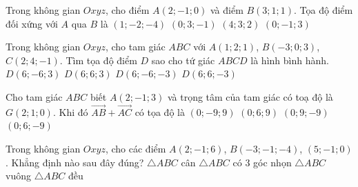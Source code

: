 \begin{ex}%
	Trong không gian $Oxyz$, cho điểm $A(2;-1;0)$ và điểm $B(3;1;1)$. Tọa độ điểm đối xứng với $A$ qua $B$ là
	\choice
	{$(1;-2;-4)$}
	{$(0; 3;-1)$}
	{\True $(4; 3; 2)$}
	{$(0;-1; 3)$}
\end{ex}

\begin{ex}%
	Trong không gian $Oxyz$, cho tam giác $ABC$ với $A(1;2;1)$, $B(-3;0;3)$, $C(2;4;-1)$. Tìm tọa độ điểm $D$ sao cho tứ giác $ABCD$ là hình bình hành.
	\choice
	{$D(6;-6;3)$}
	{$D(6;6;3)$}
	{$D(6;-6;-3)$}
	{\True $D(6;6;-3)$}
\end{ex}

\begin{ex}%
	Cho tam giác $ABC$ biết $A(2;-1;3)$ và trọng tâm của tam giác có toạ độ là $G(2;1;0)$. Khi đó $\overrightarrow{AB}+\overrightarrow{AC}$ có tọa độ là
	\choice
	{$(0;-9;9)$}
	{$(0;6;9)$}
	{$(0;9;-9)$}
	{\True $(0;6;-9)$}
\end{ex}

\begin{ex}%
	Trong không gian $Oxyz$, cho các điểm $A(2;-1;6)$, $B(-3;-1;-4)$, $(5;-1;0)$. Khẳng định nào sau đây đúng?
	\choice
	{$\triangle ABC$ cân}
	{$\triangle ABC$ có $3$ góc nhọn}
	{\True $\triangle ABC$ vuông}
	{$\triangle ABC$ đều}
\end{ex}

